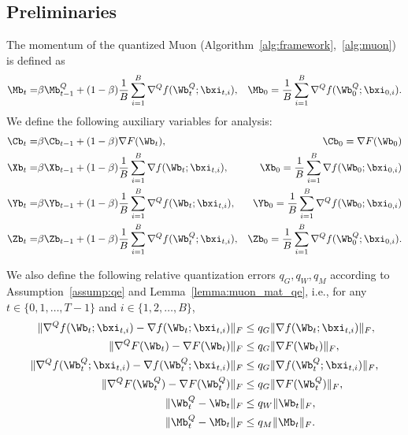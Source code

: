 \documentclass[11pt, letterpaper]{article}
\begin{document}
\subsection{Preliminaries}
The momentum of the quantized Muon (Algorithm~\ref{alg:framework},~\ref{alg:muon}) is defined as
\begin{align}
    \Mb_t =& \beta\Mb_{t-1}^Q + (1-\beta)\frac{1}{B}\sum_{i=1}^B\nabla^Q f(\Wb_t^Q; \bxi_{t,i}), &\Mb_0 = \frac{1}{B}\sum_{i=1}^B\nabla^Q f(\Wb_0^Q;\bxi_{0,i}) \label{eq:muon_M}.
\end{align}
We define the following auxiliary variables for analysis:
\begin{align}
    \Cb_t =& \beta\Cb_{t-1} + (1-\beta)\nabla F(\Wb_t), &\Cb_0 = \nabla F(\Wb_0) \label{eq:muon_C}\\
    \Xb_t =& \beta\Xb_{t-1} + (1-\beta)\frac{1}{B}\sum_{i=1}^B\nabla f(\Wb_t;\bxi_{t,i}), &\Xb_0 = \frac{1}{B}\sum_{i=1}^B\nabla f(\Wb_0;\bxi_{0,i}) \label{eq:muon_X} \\
    \Yb_t =& \beta\Yb_{t-1} + (1-\beta)\frac{1}{B}\sum_{i=1}^B\nabla^Q f(\Wb_t;\bxi_{t,i}), &\Yb_0 = \frac{1}{B}\sum_{i=1}^B\nabla^Q f(\Wb_0;\bxi_{0,i}) \label{eq:muon_Y} \\
    \Zb_t =& \beta\Zb_{t-1} + (1-\beta)\frac{1}{B}\sum_{i=1}^B\nabla^Q f(\Wb_t^Q;\bxi_{t,i}), &\Zb_0 = \frac{1}{B}\sum_{i=1}^B\nabla^Q f(\Wb_0^Q;\bxi_{0,i}) \label{eq:muon_Z} .
\end{align}

We also define the following relative quantization errors $q_G, q_W, q_M$ according to Assumption~\ref{assump:qe} and Lemma~\ref{lemma:muon_mat_qe}, i.e., for any $t\in\{0,1,\ldots,T-1\}$ and $i\in\{1,2,\ldots,B\}$,
\begin{align}\label{eq:muon_var_qe}
    \|\nabla^Q f(\Wb_t;\bxi_{t,i}) - \nabla f(\Wb_t;\bxi_{t,i})\|_F &\le q_G \|\nabla f(\Wb_t;\bxi_{t,i})\|_F, \notag \\
    \|\nabla^Q F(\Wb_t) - \nabla F(\Wb_t)\|_F &\le q_G \|\nabla F(\Wb_t)\|_F, \notag \\
    \|\nabla^Q f(\Wb_t^Q;\bxi_{t,i}) - \nabla f(\Wb_t^Q;\bxi_{t,i})\|_F &\le q_G \|\nabla f(\Wb_t^Q;\bxi_{t,i})\|_F, \notag \\
    \|\nabla^Q F(\Wb_t^Q) - \nabla F(\Wb_t^Q)\|_F &\le q_G \|\nabla F(\Wb_t^Q)\|_F, \notag \\
    \|\Wb_t^Q - \Wb_t\|_F &\le q_W \|\Wb_t\|_F, \notag \\
    \|\Mb_t^Q - \Mb_t\|_F &\le q_M \|\Mb_t\|_F. 
\end{align}
\end{document}
